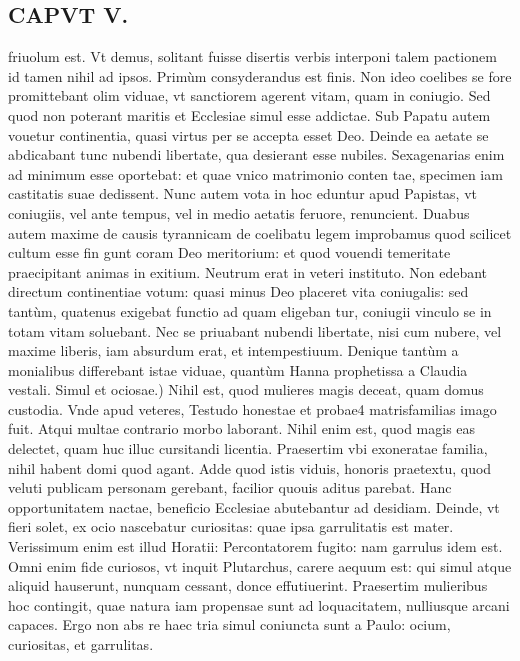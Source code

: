 \documentclass{article}
\begin{document}
\begin{pages}
\section*{CAPVT V. }
\marginpar{[ p.63 ]}\pstart friuolum est. Vt demus, solitant fuisse disertis verbis interponi talem pactionem id tamen nihil ad ipsos. Primùm consyderandus est finis. Non ideo coelibes se fore promittebant olim viduae, vt sanctiorem agerent vitam, quam in coniugio. Sed quod non poterant maritis et Ecclesiae simul esse addictae. Sub Papatu autem vouetur continentia, quasi virtus per se accepta esset Deo. Deinde ea aetate se abdicabant tunc nubendi libertate, qua desierant esse nubiles. Sexagenarias enim ad minimum esse oportebat: et quae vnico matrimonio conten tae, specimen iam castitatis suae dedissent. Nunc autem vota in hoc eduntur apud Papistas, vt coniugiis, vel ante tempus, vel in medio aetatis feruore, renuncient. Duabus autem maxime de causis tyrannicam de coelibatu legem improbamus quod scilicet cultum esse fin gunt coram Deo meritorium: et quod vouendi temeritate praecipitant animas in exitium. Neutrum erat in veteri instituto. Non edebant directum continentiae votum: quasi minus Deo placeret vita coniugalis: sed tantùm, quatenus exigebat functio ad quam eligeban tur, coniugii vinculo se in totam vitam soluebant. Nec se priuabant nubendi libertate, nisi cum nubere, vel maxime liberis, iam absurdum erat, et intempestiuum. Denique tantùm a monialibus differebant istae viduae, quantùm Hanna prophetissa a Claudia vestali.  \pend\pstart Simul et ociosae.) Nihil est, quod mulieres magis deceat, quam domus custodia. Vnde apud veteres, Testudo honestae et probae4 matrisfamilias imago fuit. Atqui multae contrario morbo laborant. Nihil enim est, quod magis eas delectet, quam huc illuc cursitandi licentia. Praesertim vbi exoneratae familia, nihil habent domi quod agant. Adde quod istis viduis, honoris praetextu, quod veluti publicam personam gerebant, facilior quouis aditus parebat. Hanc opportunitatem nactae, beneficio Ecclesiae abutebantur ad desidiam. Deinde, vt fieri solet, ex ocio nascebatur curiositas: quae ipsa garrulitatis est mater. Verissimum enim est illud Horatii: Percontatorem fugito: nam garrulus idem est. Omni enim fide curiosos, vt inquit Plutarchus, carere aequum est: qui simul atque aliquid hauserunt, nunquam cessant, donce effutiuerint. Praesertim mulieribus hoc contingit, quae natura iam propensae sunt ad loquacitatem, nulliusque arcani capaces. Ergo non abs re haec tria simul coniuncta sunt a Paulo: ocium, curiositas, et garrulitas.  \pend
{}
{}

\end{pages}
\end{document}
